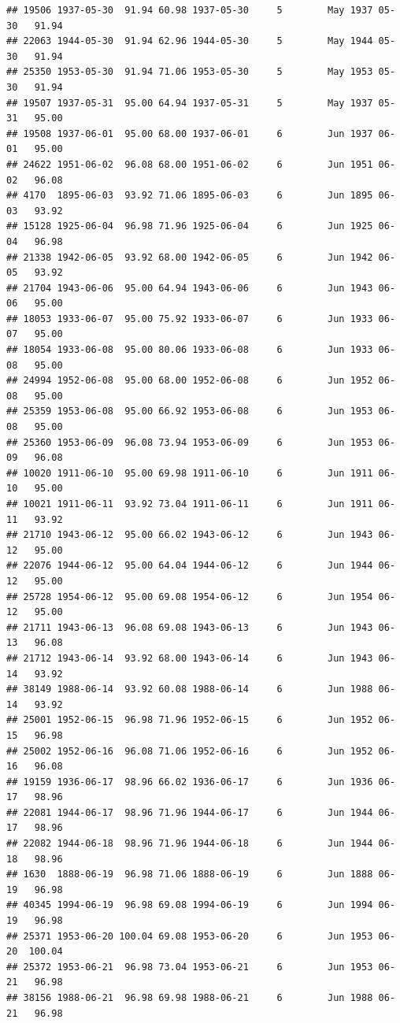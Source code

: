 \documentclass{article}\usepackage[]{graphicx}\usepackage[]{color}
\makeatletter
\newenvironment{kframe}{%
 \def\at@end@of@kframe{}%
 \ifinner\ifhmode%
  \def\at@end@of@kframe{\end{minipage}}%
  \begin{minipage}{\columnwidth}%
 \fi\fi%
 \def\FrameCommand##1{\hskip\@totalleftmargin \hskip-\fboxsep
 \colorbox{shadecolor}{##1}\hskip-\fboxsep
     \hskip-\linewidth \hskip-\@totalleftmargin \hskip\columnwidth}%
 \MakeFramed {\advance\hsize-\width
   \@totalleftmargin\z@ \linewidth\hsize
   \@setminipage}}%
 {\par\unskip\endMakeFramed%
 \at@end@of@kframe}
\newenvironment{knitrout}{}{} %
\makeatother
\begin{document}
\begin{knitrout}
\begin{kframe}
\begin{verbatim}
## 19506 1937-05-30  91.94 60.98 1937-05-30     5        May 1937 05-30   91.94
## 22063 1944-05-30  91.94 62.96 1944-05-30     5        May 1944 05-30   91.94
## 25350 1953-05-30  91.94 71.06 1953-05-30     5        May 1953 05-30   91.94
## 19507 1937-05-31  95.00 64.94 1937-05-31     5        May 1937 05-31   95.00
## 19508 1937-06-01  95.00 68.00 1937-06-01     6        Jun 1937 06-01   95.00
## 24622 1951-06-02  96.08 68.00 1951-06-02     6        Jun 1951 06-02   96.08
## 4170  1895-06-03  93.92 71.06 1895-06-03     6        Jun 1895 06-03   93.92
## 15128 1925-06-04  96.98 71.96 1925-06-04     6        Jun 1925 06-04   96.98
## 21338 1942-06-05  93.92 68.00 1942-06-05     6        Jun 1942 06-05   93.92
## 21704 1943-06-06  95.00 64.94 1943-06-06     6        Jun 1943 06-06   95.00
## 18053 1933-06-07  95.00 75.92 1933-06-07     6        Jun 1933 06-07   95.00
## 18054 1933-06-08  95.00 80.06 1933-06-08     6        Jun 1933 06-08   95.00
## 24994 1952-06-08  95.00 68.00 1952-06-08     6        Jun 1952 06-08   95.00
## 25359 1953-06-08  95.00 66.92 1953-06-08     6        Jun 1953 06-08   95.00
## 25360 1953-06-09  96.08 73.94 1953-06-09     6        Jun 1953 06-09   96.08
## 10020 1911-06-10  95.00 69.98 1911-06-10     6        Jun 1911 06-10   95.00
## 10021 1911-06-11  93.92 73.04 1911-06-11     6        Jun 1911 06-11   93.92
## 21710 1943-06-12  95.00 66.02 1943-06-12     6        Jun 1943 06-12   95.00
## 22076 1944-06-12  95.00 64.04 1944-06-12     6        Jun 1944 06-12   95.00
## 25728 1954-06-12  95.00 69.08 1954-06-12     6        Jun 1954 06-12   95.00
## 21711 1943-06-13  96.08 69.08 1943-06-13     6        Jun 1943 06-13   96.08
## 21712 1943-06-14  93.92 68.00 1943-06-14     6        Jun 1943 06-14   93.92
## 38149 1988-06-14  93.92 60.08 1988-06-14     6        Jun 1988 06-14   93.92
## 25001 1952-06-15  96.98 71.96 1952-06-15     6        Jun 1952 06-15   96.98
## 25002 1952-06-16  96.08 71.06 1952-06-16     6        Jun 1952 06-16   96.08
## 19159 1936-06-17  98.96 66.02 1936-06-17     6        Jun 1936 06-17   98.96
## 22081 1944-06-17  98.96 71.96 1944-06-17     6        Jun 1944 06-17   98.96
## 22082 1944-06-18  98.96 71.96 1944-06-18     6        Jun 1944 06-18   98.96
## 1630  1888-06-19  96.98 71.06 1888-06-19     6        Jun 1888 06-19   96.98
## 40345 1994-06-19  96.98 69.08 1994-06-19     6        Jun 1994 06-19   96.98
## 25371 1953-06-20 100.04 69.08 1953-06-20     6        Jun 1953 06-20  100.04
## 25372 1953-06-21  96.98 73.04 1953-06-21     6        Jun 1953 06-21   96.98
## 38156 1988-06-21  96.98 69.98 1988-06-21     6        Jun 1988 06-21   96.98

\end{verbatim}
\end{kframe}
\end{knitrout}
\end{document}
